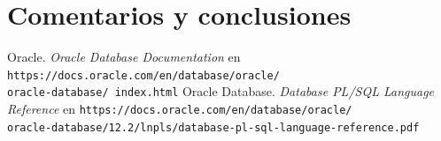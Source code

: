 \documentclass{article}
\begin{document}
\section*{Comentarios y conclusiones}


\renewcommand\refname{Bibliografía}
\begin{thebibliography}{99}
     Oracle. \textit{Oracle Database Documentation} en 
        \texttt{https://docs.oracle.com/en/database/oracle/\\oracle-database/%
        index.html}
     Oracle Database. \textit{Database PL/SQL Language 
        Reference} en 
        \texttt{https://docs.oracle.com/en/database/oracle/\\
        oracle-database/12.2/lnpls/database-pl-sql-language-reference.pdf}
\end{thebibliography}
\end{document}
